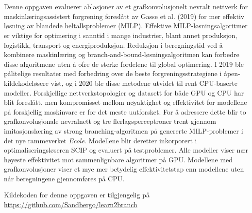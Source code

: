\chapter*{\norwegianabstractname}
%
Denne oppgaven evaluerer ablasjoner av et grafkonvolusjonelt nevralt nettverk for maskinlæringsassistert forgrening foreslått av Gasse et al. (2019) for mer effektiv løsning av blandede heltallsproblemer (\gls{MILP}).
Effektive \gls{MILP}-løsningsalgoritmer er viktige for optimering i sanntid i mange industrier, blant annet produksjon, logistikk, transport og energiproduksjon. 
Reduksjon i beregningstid ved å kombinere maskinlæring og branch-and-bound-løsningsalgoritmen kan forbedre disse algoritmene uten å ofre de sterke fordelene til global optimering.  
I 2019 ble pålitelige resultater med forbedring over de beste forgreningsstrategiene i åpen-kildekodeløsere vist, og i 2020 ble disse metodene utvidet til rent \gls{CPU}-baserte modeller.
Forskjellige nettverkstopologier og datasett for både \gls{GPU} og \gls{CPU} har blit foreslått, men kompromisset mellom nøyaktighet og effektivitet for modellene på forskjellig maskinvare er for det meste uutforsket. 
For å adressere dette blir to grafkonvolusjonale nevralnett og tre flerlagsperceptroner trent gjennom imitasjonslæring av strong branching-algoritmen på genererte \gls{MILP}-problemer i det nye rammeverket \textit{\gls{Ecole}}. Modellene blir deretter inkorporert i optimaliseringsløseren \gls{SCIP} og evaluert på testproblemer. Alle modeller viser nær høyeste effektivitet mot sammenlignbare algoritmer på \gls{GPU}. Modellene med grafkonvolusjoner viser et mye mer betydelig effektivitetstap enn modellene uten når beregningene gjennomføres på \gls{CPU}.

Kildekoden for denne oppgaven er tilgjengelig på\\ \url{https://github.com/Sandbergo/learn2branch}
\clearpage
